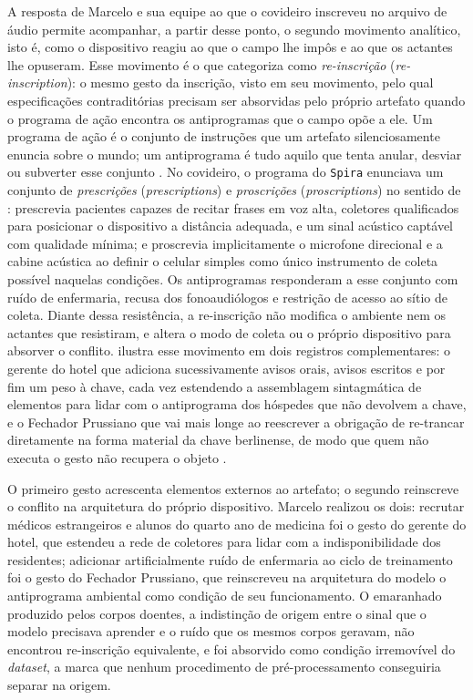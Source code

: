 A resposta de Marcelo e sua equipe ao que o covideiro inscreveu no arquivo de áudio permite acompanhar, a partir desse ponto, o segundo movimento analítico, isto é, como o dispositivo reagiu ao que o campo lhe impôs e ao que os actantes lhe opuseram. Esse movimento é o que \textcite{Latour1992Missing} categoriza como \textit{re-inscrição} (\textit{re-inscription}): o mesmo gesto da inscrição, visto em seu movimento, pelo qual especificações contraditórias precisam ser absorvidas pelo próprio artefato quando o programa de ação encontra os antiprogramas que o campo opõe a ele. Um programa de ação é o conjunto de instruções que um artefato silenciosamente enuncia sobre o mundo; um antiprograma é tudo aquilo que tenta anular, desviar ou subverter esse conjunto \parencite{Latour1992Missing}. No covideiro, o programa do \texttt{Spira} enunciava um conjunto de \textit{prescrições} (\textit{prescriptions}) e \textit{proscrições} (\textit{proscriptions}) no sentido de \textcite{Akrich1992Description}: prescrevia pacientes capazes de recitar frases em voz alta, coletores qualificados para posicionar o dispositivo a distância adequada, e um sinal acústico captável com qualidade mínima; e proscrevia implicitamente o microfone direcional e a cabine acústica ao definir o celular simples como único instrumento de coleta possível naquelas condições. Os antiprogramas responderam a esse conjunto com ruído de enfermaria, recusa dos fonoaudiólogos e restrição de acesso ao sítio de coleta. Diante dessa resistência, a re-inscrição não modifica o ambiente nem os actantes que resistiram, e altera o modo de coleta ou o próprio dispositivo para absorver o conflito. \textcite{Latour1992Missing} ilustra esse movimento em dois registros complementares: o gerente do hotel que adiciona sucessivamente avisos orais, avisos escritos e por fim um peso à chave, cada vez estendendo a assemblagem sintagmática de elementos para lidar com o antiprograma dos hóspedes que não devolvem a chave, e o Fechador Prussiano que vai mais longe ao reescrever a obrigação de re-trancar diretamente na forma material da chave berlinense, de modo que quem não executa o gesto não recupera o objeto \parencite{Latour2000BerlinKey}.

O primeiro gesto acrescenta elementos externos ao artefato; o segundo reinscreve o conflito na arquitetura do próprio dispositivo. Marcelo realizou os dois: recrutar médicos estrangeiros e alunos do quarto ano de medicina foi o gesto do gerente do hotel, que estendeu a rede de coletores para lidar com a indisponibilidade dos residentes; adicionar artificialmente ruído de enfermaria ao ciclo de treinamento foi o gesto do Fechador Prussiano, que reinscreveu na arquitetura do modelo o antiprograma ambiental como condição de seu funcionamento. O emaranhado produzido pelos corpos doentes, a indistinção de origem entre o sinal que o modelo precisava aprender e o ruído que os mesmos corpos geravam, não encontrou re-inscrição equivalente, e foi absorvido como condição irremovível do \textit{dataset}, a marca que nenhum procedimento de pré-processamento conseguiria separar na origem.

